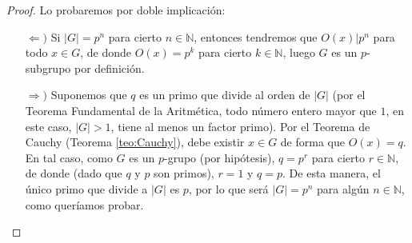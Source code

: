 \documentclass[12pt]{article}
\newcommand{\N}{\mathbb{N}}
\begin{document}
\begin{ejercicio}
        \begin{proof}
            Lo probaremos por doble implicación:
            \begin{itemize}
                \item[$\Longleftarrow)$] Si $|G|=p^n$ para cierto $n \in \N$, entonces tendremos que $O(x) | p^n$ para todo $x \in G$, de donde $O(x) = p^{k}$ para cierto $k \in \N$, luego $G$ es un $p$-subgrupo por definición. 
                \item[$\Longrightarrow)$] Suponemos que $q$ es un primo que divide al orden de $|G|$ (por el Teorema Fundamental de la Aritmética, todo número entero mayor que $1$, en este caso, $|G|>1$, tiene al menos un factor primo). Por el Teorema de Cauchy (Teorema \ref{teo:Cauchy}), debe existir $x \in G$ de forma que $O(x) = q$. En tal caso, como $G$ es un $p$-grupo (por hipótesis), $q=p^{r}$ para cierto $r \in \N$, de donde (dado que $q$ y $p$ son primos), $r = 1$ y $q = p$. De esta manera, el único primo que divide a $|G|$ es $p$, por lo que será $|G| = p^{n}$ para algún $n \in \N$, como queríamos probar.
                \end{itemize}
        \end{proof}
    \end{ejercicio}
\end{document}
